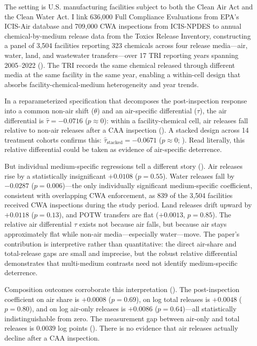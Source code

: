 \documentclass[12pt]{article}
\begin{document}
The setting is U.S. manufacturing facilities subject to both the Clean Air Act and the Clean Water Act. I link 636,000 Full Compliance Evaluations from EPA's ICIS-Air database and 709,000 CWA inspections from ICIS-NPDES to annual chemical-by-medium release data from the Toxics Release Inventory, constructing a panel of 3,504 facilities reporting 323 chemicals across four release media---air, water, land, and wastewater transfers---over 17 TRI reporting years spanning 2005--2022 (). The TRI records the same chemical released through different media at the same facility in the same year, enabling a within-cell design that absorbs facility-chemical-medium heterogeneity and year trends.

In a reparameterized specification that decomposes the post-inspection response into a common non-air shift ($\theta$) and an air-specific differential ($\tau$), the air differential is $\hat{\tau} = -0.0716$ ($p \approx 0$): within a facility-chemical cell, air releases fall relative to non-air releases after a CAA inspection (). A stacked design across 14 treatment cohorts confirms this: $\hat{\tau}_{\text{stacked}} = -0.0671$ ($p \approx 0$; ). Read literally, this relative differential could be taken as evidence of air-specific deterrence.

But individual medium-specific regressions tell a different story (). Air releases rise by a statistically insignificant $+0.0108$ ($p = 0.55$). Water releases fall by $-0.0287$ ($p = 0.006$)---the only individually significant medium-specific coefficient, consistent with overlapping CWA enforcement, as 839 of the 3,504 facilities received CWA inspections during the study period. Land releases drift upward by $+0.0118$ ($p = 0.13$), and POTW transfers are flat ($+0.0013$, $p = 0.85$). The relative air differential $\tau$ exists not because air falls, but because air stays approximately flat while non-air media---especially water---move. The paper's contribution is interpretive rather than quantitative: the direct air-share and total-release gaps are small and imprecise, but the robust relative differential demonstrates that multi-medium contrasts need not identify medium-specific deterrence.

Composition outcomes corroborate this interpretation (). The post-inspection coefficient on air share is $+0.0008$ ($p = 0.69$), on log total releases is $+0.0048$ ($p = 0.80$), and on log air-only releases is $+0.0086$ ($p = 0.64$)---all statistically indistinguishable from zero. The measurement gap between air-only and total releases is $0.0039$ log points (). There is no evidence that air releases actually decline after a CAA inspection.
\end{document}
